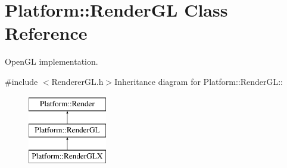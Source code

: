 \hypertarget{classPlatform_1_1RenderGL}{
\section{Platform::RenderGL Class Reference}
\label{classPlatform_1_1RenderGL}
}


OpenGL implementation.  


{\ttfamily \#include $<$RendererGL.h$>$}Inheritance diagram for Platform::RenderGL::\begin{figure}[H]
\begin{center}
\leavevmode
\includegraphics[height=3cm]{classPlatform_1_1RenderGL}
\end{center}
\end{figure}
